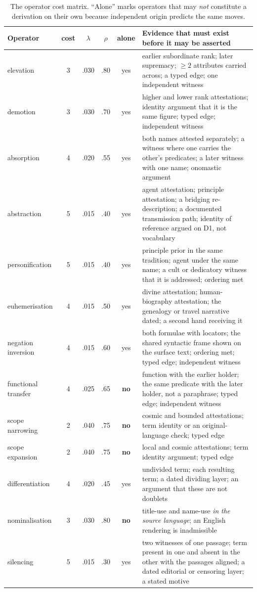 \documentclass[11pt]{article}
\DeclareRobustCommand{\_}{\textunderscore\allowbreak}
\begin{document}
\begin{table}[t]
\centering
\footnotesize
\caption{The operator cost matrix. ``Alone'' marks operators that may
\emph{not} constitute a derivation on their own because independent origin
predicts the same moves.}
\label{tab:operators}
\begin{tabular}{L{2.7cm} c c c c L{6.0cm}}
\toprule
Operator & cost & \(\lambda\) & \(\rho\) & alone & Evidence that must exist before it may be asserted \\
\midrule
elevation & 3 & .030 & .80 & yes & earlier subordinate rank; later supremacy; \(\ge 2\) attributes carried across; a typed edge; one independent witness \\
demotion & 3 & .030 & .70 & yes & higher and lower rank attestations; identity argument that it is the same figure; typed edge; independent witness \\
absorption & 4 & .020 & .55 & yes & both names attested separately; a witness where one carries the other's predicates; a later witness with one name; onomastic argument \\
abstraction & 5 & .015 & .40 & yes & agent attestation; principle attestation; a bridging re-description; a documented transmission path; identity of reference argued on D1, not vocabulary \\
personification & 5 & .015 & .40 & yes & principle prior in the same tradition; agent under the same name; a cult or dedicatory witness that it is addressed; ordering met \\
euhemerisation & 4 & .015 & .50 & yes & divine attestation; human-biography attestation; the genealogy or travel narrative dated; a second hand receiving it \\
negation inversion & 4 & .015 & .60 & yes & both formulae with locators; the shared syntactic frame shown on the surface text; ordering met; typed edge; independent witness \\
functional transfer & 4 & .025 & .65 & \textbf{no} & function with the earlier holder; the same predicate with the later holder, not a paraphrase; typed edge; independent witness \\
scope narrowing & 2 & .040 & .75 & \textbf{no} & cosmic and bounded attestations; term identity or an original-language check; typed edge \\
scope expansion & 2 & .040 & .75 & \textbf{no} & local and cosmic attestations; term identity argument; typed edge \\
differentiation & 4 & .020 & .45 & yes & undivided term; each resulting term; a dated dividing layer; an argument that these are not doublets \\
nominalisation & 3 & .030 & .80 & \textbf{no} & title-use and name-use \emph{in the source language}; an English rendering is inadmissible \\
silencing & 5 & .015 & .30 & yes & two witnesses of one passage; term present in one and absent in the other with the passages aligned; a dated editorial or censoring layer; a stated motive \\
\bottomrule
\end{tabular}
\end{table}
\end{document}
